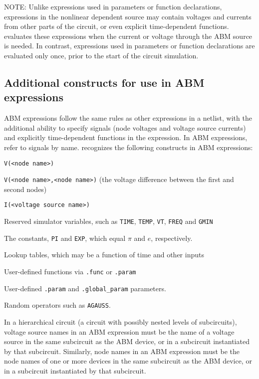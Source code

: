 NOTE: Unlike expressions used in parameters or function declarations,
expressions in the nonlinear dependent source may contain voltages and
currents from other parts of the circuit, or even explicit
time-dependent functions.  \Xyce{} evaluates these expressions when the
current or voltage through the ABM source is needed.  In contrast, expressions
used in parameters or function declarations are evaluated only once, prior
to the start of the circuit simulation.

\subsection{Additional constructs for use in ABM expressions}

ABM expressions follow the same rules as other expressions in a
netlist, with the additional ability to specify signals (node voltages
and voltage source currents) and explicitly time-dependent functions
in the expression.  In ABM expressions, refer to signals by
name. \Xyce{} recognizes the following constructs in ABM expressions:
\begin{XyceItemize}
\item \texttt{V(<node name>)}
\item \texttt{V(<node name>,<node name>)} (the voltage difference between the first and second nodes)
\item \texttt{I(<voltage source name>)}
\item Reserved simulator variables, such as \texttt{TIME}, \texttt{TEMP}, \texttt{VT}, \texttt{FREQ} and \texttt{GMIN}
\item The constants, \texttt{PI} and \texttt{EXP}, which equal $\pi$ and $e$, respectively.
\item Lookup tables, which may be a function of time and other inputs
\item User-defined functions via \texttt{.func} or \texttt{.param}
\item User-defined \texttt{.param} and \texttt{.global\_param} parameters.
\item Random operators such as \texttt{AGAUSS}.
\end{XyceItemize}

In a hierarchical circuit (a circuit with possibly nested levels of
subcircuits), voltage source names in an ABM expression must be the
name of a voltage source in the same subcircuit as the ABM device, or in a
subcircuit instantiated by that subcircuit.  Similarly, node names in an ABM 
expression must be the node names of one or more devices in the same subcircuit
as the ABM device, or in a subcircuit instantiated by that subcircuit. 

